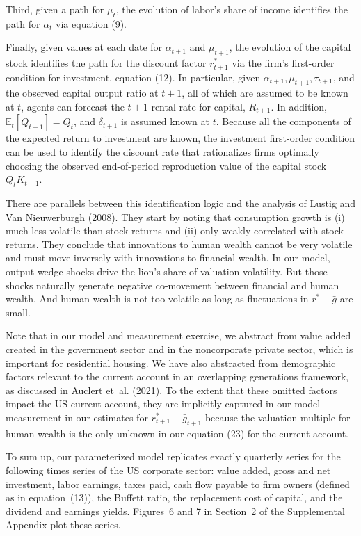 \documentclass[11pt]{article}
\begin{document}
Third, given a path for $\mu _{t}$, the evolution of labor’s share of income identifies the path for $\alpha _{t}$ via equation (9).


Finally, given values at each date for $\alpha _{t+1}$ and $\mu _{t+1}$, the evolution of the capital stock identifies the path for the discount factor $r_{t+1}^{*}$ via the firm’s first-order condition for investment, equation (12). In particular, given $\alpha _{t+1},\mu _{t+1},\tau _{t+1}$, and the observed capital output ratio at $t+1$, all of which are assumed to be known at $t$, agents can forecast the $t+1$ rental rate for capital, $R_{t+1}$. In addition, $\mathbb{E}_{t}[Q_{t+1}]=Q_{t}$, and $\delta _{t+1}$ is assumed known at $t$. Because all the components of the expected return to investment are known, the investment first-order condition can be used to identify the discount rate that rationalizes firms optimally choosing the observed end-of-period reproduction value of the capital stock $Q_{t}K_{t+1}$.


There are parallels between this identification logic and the analysis of Lustig and Van Nieuwerburgh (2008). They start by noting that consumption growth is (i) much less volatile than stock returns and (ii) only weakly correlated with stock returns. They conclude that innovations to human wealth cannot be very volatile and must move inversely with innovations to financial wealth. In our model, output wedge shocks drive the lion’s share of valuation volatility. But those shocks naturally generate negative co-movement between financial and human wealth. And human wealth is not too volatile as long as fluctuations in $r^{*}-\bar{g}$ are small.

Note that in our model and measurement exercise, we abstract from value added created in the government sector and in the noncorporate private sector, which is important for residential housing. We have also abstracted from demographic factors relevant to the current account in an overlapping generations framework, as discussed in Auclert et al. (2021). To the extent that these omitted factors impact the US current account, they are implicitly captured in our model measurement in our estimates for $r_{t+1}^{*}-\bar{g}_{t+1}$ because the valuation multiple for human wealth is the only unknown in our equation (23) for the current account.


To sum up, our parameterized model replicates exactly quarterly series for the following times series of the US corporate sector: value added, gross and net investment, labor earnings, taxes paid, cash flow payable to firm owners (defined as in equation (13)), the Buffett ratio, the replacement cost of capital, and the dividend and earnings yields. Figures 6 and 7 in Section 2 of the Supplemental Appendix plot these series.
\end{document}
